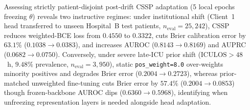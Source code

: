 \documentclass{llncs}
\begin{document}
Assessing strictly patient-disjoint post-drift CSSP adaptation (5 local epochs freezing $\theta$) reveals two instructive regimes: under institutional shift (Client~1 head transferred to unseen Hospital~B test patients, $n_{\mathrm{eval}}=25{,}242$), CSSP reduces weighted-BCE loss from $0.4550$ to $0.3322$, cuts Brier calibration error by $63.1\%$ ($0.1038\to 0.0383$), and increases AUROC ($0.8143\to 0.8169$) and AUPRC ($0.0682\to 0.0750$). Conversely, under severe late-ICU prior shift ($\mathrm{ICULOS}>48$~h, $9.48\%$ prevalence, $n_{\mathrm{eval}}=3{,}950$), static \texttt{pos\_weight=8.0} over-weights minority positives and degrades Brier error ($0.2004\to 0.2723$), whereas prior-matched unweighted fine-tuning cuts Brier error by $57.4\%$ ($0.2004\to 0.0853$) though frozen-backbone AUROC dips ($0.6360\to 0.5968$), identifying when unfreezing representation layers is needed alongside head adaptation.

\begin{table}[t]
\centering
\caption{Chronological drift detection delay (rounds post-$r^*=11$, mean $\pm$ SD, 5 streams) and FAR under 1-round clinical label lag and zero-lag monitoring.}
\label{tab:drift}
\end{table}
\end{document}
